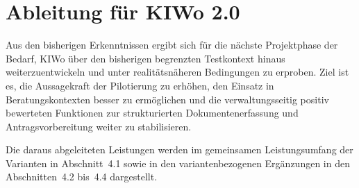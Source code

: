 \section{Ableitung für KIWo 2.0}

Aus den bisherigen Erkenntnissen ergibt sich für die nächste Projektphase
der Bedarf, KIWo über den bisherigen begrenzten Testkontext hinaus
weiterzuentwickeln und unter realitätsnäheren Bedingungen zu erproben. Ziel
ist es, die Aussagekraft der Pilotierung zu erhöhen, den Einsatz in
Beratungskontexten besser zu ermöglichen und die verwaltungsseitig positiv
bewerteten Funktionen zur strukturierten Dokumentenerfassung und
Antragsvorbereitung weiter zu stabilisieren.

Die daraus abgeleiteten Leistungen werden im gemeinsamen Leistungsumfang der
Varianten in Abschnitt~4.1 sowie in den variantenbezogenen Ergänzungen in
den Abschnitten~4.2 bis~4.4 dargestellt.
